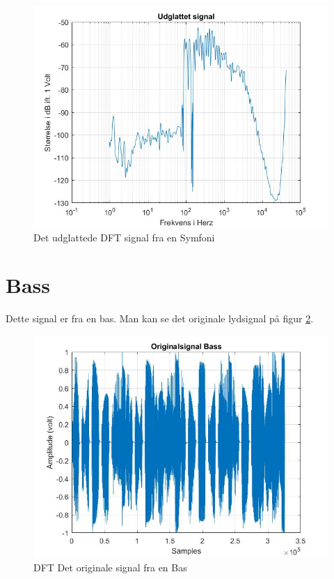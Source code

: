 \begin{figure}[H]
	\centering
	\includegraphics[width=140mm]{figures/Symfoni/udglattet.jpg}
	\caption{Det udglattede DFT signal fra en Symfoni}
	\label{fig:Symfoni udglattet}
\end{figure}

\section{Bass}
Dette signal er fra en bas. Man kan se det originale lydsignal på figur \ref{fig:Bas original}.
\begin{figure}[H]
	\centering
	\includegraphics[width=140mm]{figures/Bass/original.jpg}
	\caption{DFT Det originale signal fra en Bas}
	\label{fig:Bas original}
\end{figure}

